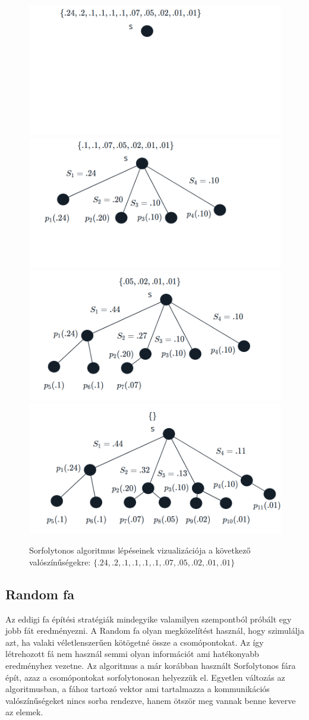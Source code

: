 \documentclass[12pt]{report}
\begin{document}
\begin{figure}[H]
	\begin{center}
		\includegraphics[width=0.49\linewidth]{pictures/bfs1.png}
		\includegraphics[width=0.49\linewidth]{pictures/bfs2.png}
		\includegraphics[width=0.49\linewidth]{pictures/bfs3.png}
		\includegraphics[width=0.49\linewidth]{pictures/bfs4.png}
		\caption{Sorfolytonos algoritmus lépéseinek vizualizációja a következő valószínűségekre: 
			\( \{.24, .2, .1, .1, .1, .1, .07, .05, .02, .01, .01\}\)}
		\label{bfs-algorithm}
	\end{center}
\end{figure}



\subsection{Random fa}

Az eddigi fa építési stratégiák mindegyike valamilyen szempontból próbált egy jobb fát eredményezni.
A Random fa olyan megközelítést használ, hogy szimulálja azt, ha valaki véletlenszerűen kötögetné össze a csomópontokat.
Az így létrehozott fá nem használ semmi olyan információt ami hatékonyabb eredményhez vezetne.
Az algoritmus a már korábban használt Sorfolytonos fára épít, azaz a csomópontokat sorfolytonosan helyezzük el.
Egyetlen változás az algoritmusban, a fához tartozó vektor ami tartalmazza a kommunikációs valószínűségeket nincs sorba rendezve, hanem ötször meg vannak benne keverve az elemek. 
\end{document}
